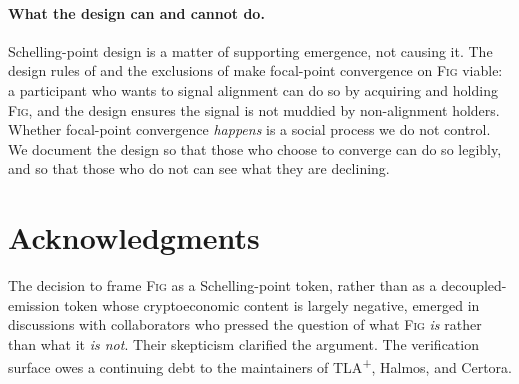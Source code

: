 \documentclass[11pt,a4paper]{article}
\theoremstyle{definition}
\theoremstyle{remark}
\newcommand{\fig}{\textsc{Fig}}
\begin{document}
\paragraph{What the design can and cannot do.}
Schelling-point design is a matter of supporting emergence, not
causing it. The design rules of  and the
exclusions of  make focal-point convergence
on \fig{} viable: a participant who wants to signal alignment
can do so by acquiring and holding \fig{}, and the design
ensures the signal is not muddied by non-alignment holders.
Whether focal-point convergence \emph{happens} is a social
process we do not control. We document the design so that those
who choose to converge can do so legibly, and so that those who
do not can see what they are declining.

\section*{Acknowledgments}
The decision to frame \fig{} as a Schelling-point token,
rather than as a decoupled-emission token whose cryptoeconomic
content is largely negative, emerged in discussions with
collaborators who pressed the question of what \fig{}
\emph{is} rather than what it \emph{is not}. Their skepticism
clarified the argument. The verification surface owes a
continuing debt to the maintainers of TLA\textsuperscript{+},
Halmos, and Certora.


\end{document}
